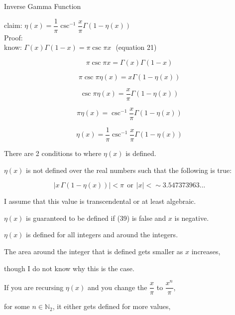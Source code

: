 \documentclass[12pt]{article}
\begin{document}
\pagebreak
\begin{section}{Inverse Gamma Function}
	
	claim: $\eta(x)=\dfrac1\pi\csc^{-1}\dfrac x\pi\Gamma(1-\eta(x))$\\
	Proof:\\
	know: $\Gamma(x)\Gamma(1-x)=\pi\csc\pi x~~~$(equation 21)

	\begin{equation}
		\pi\csc\pi x=\Gamma(x)\Gamma(1-x)
	\end{equation}

	\begin{equation}
		\pi\csc\pi\eta(x)=x\Gamma(1-\eta(x))
	\end{equation}

	\begin{equation}
		\csc\pi\eta(x)=\dfrac x\pi\Gamma(1-\eta(x))
	\end{equation}

	\begin{equation}
		\pi\eta(x)=\csc^{-1}\dfrac x\pi\Gamma(1-\eta(x))
	\end{equation}

	\begin{equation}
		\eta(x)=\dfrac1\pi\csc^{-1}\dfrac x\pi\Gamma(1-\eta(x))
	\end{equation}

	\noindent\blacksquare

	There are 2 conditions to where $\eta(x)$ is defined.

	$\eta(x)$ is not defined over the real numbers such that the following is true:

	\begin{equation}
		|x\,\Gamma(1-\eta(x))|<\pi~~\text{or}~~|x|<\sim3.547373963...
	\end{equation}

	I assume that this value is transcendental or at least algebraic.

	$\eta(x)$ is guaranteed to be defined if (39) is false and $x$ is negative.

	$\eta(x)$ is defined for all integers and around the integers.

	The area around the integer that is defined gets smaller as $x$ increases,

	though I do not know why this is the case.

	If you are recursing $\eta(x)$ and you change the $\dfrac x\pi$ to $\dfrac{x^n}\pi$,

	for some $n\in\mathbb N_2$, it either gets defined for more values,


\end{section}
\end{document}
